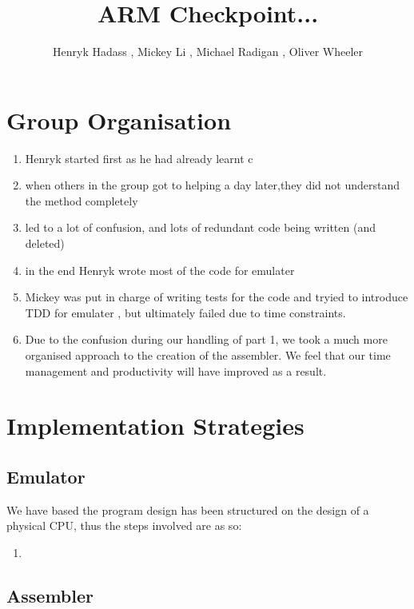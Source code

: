 \documentclass[11pt]{article}
\begin{document}
\title{ARM Checkpoint... }
\author{Henryk Hadass , Mickey Li , Michael Radigan , Oliver Wheeler}

\maketitle

\section{Group Organisation}

\begin{enumerate}

\item
Henryk started first as he had already learnt c

\item
when others in the group got to helping a day later,they did not understand the method completely

\item 
led to a lot of confusion, and lots of redundant code being written (and deleted)

\item
in the end Henryk wrote most of the code for emulater


\item
Mickey was put in charge of writing tests for the code and tryied to introduce TDD for emulater , but ultimately failed due to time constraints. 

\item
Due to the confusion during our handling of part 1, we took a much more organised approach to the creation of the assembler. We feel that our time management and productivity will have improved as a result. 

\end{enumerate}



\section{Implementation Strategies}
\subsection{Emulator}
We have based the program design has been structured on the design of a physical CPU, thus the steps involved are as so:
\begin{enumerate}
\item



\end{enumerate}

\subsection{Assembler}
\end{document}
